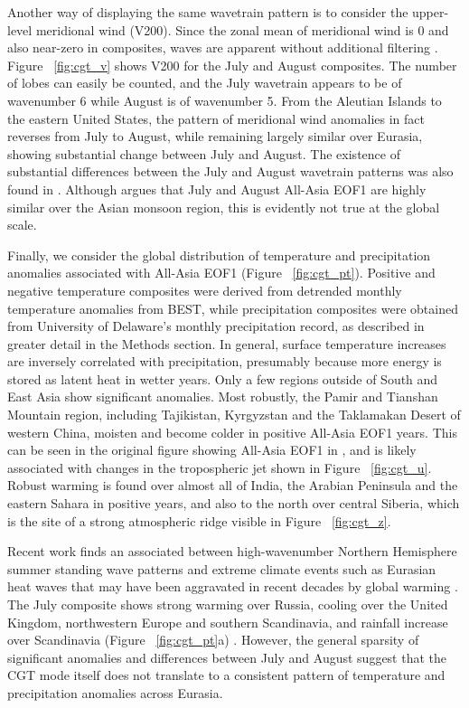 	Another way of displaying the same wavetrain pattern is to consider the upper-level meridional wind (V200). Since the zonal mean of meridional wind is 0 and also near-zero in composites, waves are apparent without additional filtering \citep{Branstator2002}. Figure ~\ref{fig:cgt_v} shows V200 for the July and August composites. The number of lobes can easily be counted, and the July wavetrain appears to be of wavenumber 6 while August is of wavenumber 5. From the Aleutian Islands to the eastern United States, the pattern of meridional wind anomalies in fact reverses from July to August, while remaining largely similar over Eurasia, showing substantial change between July and August. The existence of substantial differences between the July and August wavetrain patterns was also found in \citet{Ding2005a}. Although \citet{Day2015} argues that July and August All-Asia EOF1 are highly similar over the Asian monsoon region, this is evidently not true at the global scale.
	
	Finally, we consider the global distribution of temperature and precipitation anomalies associated with All-Asia EOF1 (Figure ~\ref{fig:cgt_pt}). Positive and negative temperature composites were derived from detrended monthly temperature anomalies from BEST, while precipitation composites were obtained from University of Delaware's monthly precipitation record, as described in greater detail in the Methods section. In general, surface temperature increases are inversely correlated with precipitation, presumably because more energy is stored as latent heat in wetter years. Only a few regions outside of South and East Asia show significant anomalies. Most robustly, the Pamir and Tianshan Mountain region, including Tajikistan, Kyrgyzstan and the Taklamakan Desert of western China, moisten and become colder in positive All-Asia EOF1 years. This can be seen in the original figure showing All-Asia EOF1 in \citet{Day2015}, and is likely associated with changes in the tropospheric jet shown in Figure ~\ref{fig:cgt_u}. Robust warming is found over almost all of India, the Arabian Peninsula and the eastern Sahara in positive years, and also to the north over central Siberia, which is the site of a strong atmospheric ridge visible in Figure ~\ref{fig:cgt_z}.
	
	Recent work finds an associated between high-wavenumber Northern Hemisphere summer standing wave patterns and extreme climate events such as Eurasian heat waves that may have been aggravated in recent decades by global warming \citep{Petoukhov2013,Schubert2014a}. The July composite shows strong warming over Russia, cooling over the United Kingdom, northwestern Europe and southern Scandinavia, and rainfall increase over Scandinavia (Figure ~\ref{fig:cgt_pt}a) . However, the general sparsity of significant anomalies and differences between July and August suggest that the CGT mode itself does not translate to a consistent pattern of temperature and precipitation anomalies across Eurasia.
	
